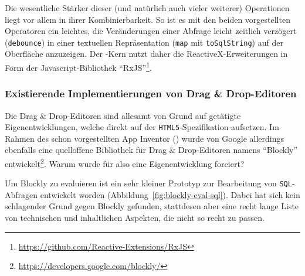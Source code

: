 Die wesentliche Stärker dieser (und natürlich auch vieler weiterer) Operationen liegt vor allem in ihrer Kombinierbarkeit. So ist es mit den beiden vorgestellten Operatoren ein leichtes, die Veränderungen einer Abfrage leicht zeitlich verzögert (\texttt{debounce}) in einer textuellen Repräsentation (\texttt{map} mit \texttt{toSqlString}) auf der Oberfläche anzuzeigen. Der \idename{}-Kern nutzt daher die ReactiveX-Erweiterungen in Form der Javascript-Bibliothek "`RxJS"'\footnote{\url{https://github.com/Reactive-Extensions/RxJS}}.

\subsubsection{Existierende Implementierungen von Drag \& Drop-Editoren}

Die Drag \& Drop-Editoren sind allesamt von Grund auf getätigte Eigenentwicklungen, welche direkt auf der \texttt{HTML5}-Spezifikation aufsetzen. Im Rahmen des schon vorgestellten App Inventor () wurde von Google allerdings ebenfalls eine quelloffene Bibliothek für Drag \& Drop-Editoren namens "`Blockly"' entwickelt\footnote{\url{https://developers.google.com/blockly/}}. Warum wurde für \idename{} also eine Eigenentwicklung forciert?

Um Blockly zu evaluieren ist ein sehr kleiner Prototyp zur Bearbeitung von \texttt{SQL}-Abfragen entwickelt worden (Abbildung~\ref{fig:blockly-eval-sql}). Dabei hat sich kein schlagender Grund gegen Blockly gefunden, stattdesen aber eine recht lange Liste von technischen und inhaltlichen Aspekten, die nicht so recht zu \idename{} passen.

